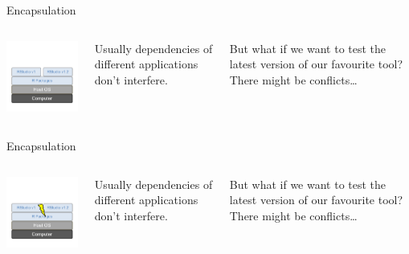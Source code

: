 \begin{frame}{Encapsulation}
\begin{columns}

\includegraphics[width=6cm]{02_encapsulation/figures/intro_encapsulation_v2-3.pdf}

Usually dependencies of different applications don’t interfere.


But what if we want to test the latest version of our favourite tool?
There might be conflicts…

\end{columns}
\end{frame}

\begin{frame}{Encapsulation}
\begin{columns}

\includegraphics[width=6cm]{02_encapsulation/figures/intro_encapsulation_v2-4.pdf}

Usually dependencies of different applications don’t interfere.


But what if we want to test the latest version of our favourite tool?
There might be conflicts…

\end{columns}
\end{frame}



